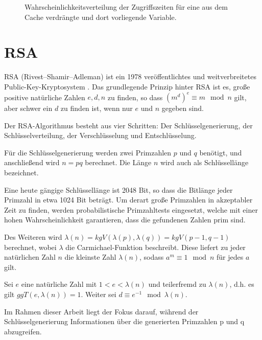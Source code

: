 \label{fig:RAMCacheLatency}
\begin{figure}[h]
\centering
\begin{scaletikzpicturetowidth}{\textwidth}

\end{scaletikzpicturetowidth}
\caption{Wahrscheinlichkeitsverteilung der Zugriffszeiten für eine aus dem Cache verdrängte und dort vorliegende Variable.}
\end{figure}

\section{RSA}

RSA (Rivest–Shamir–Adleman) ist ein 1978 veröffentlichtes und weitverbreitetes Public-Key-Kryptosystem \cite{RSAPaper}.
Das grundlegende Prinzip hinter RSA ist es,  große positive natürliche Zahlen $e,d,n$ zu finden, so dass $(m^d)^e \equiv m \mod n$ gilt, aber schwer ein $d$ zu finden ist, wenn nur $e$ und $n$ gegeben sind.

Der RSA-Algorithmus besteht aus vier Schritten: Der Schlüsselgenerierung, der Schlüsselverteilung, der Verschlüsselung und Entschlüsselung.

Für die Schlüsselgenerierung werden zwei Primzahlen $p$ und $q$ benötigt, und anschließend wird $n = pq$ berechnet. Die Länge $n$ wird auch als Schlüssellänge bezeichnet.

Eine heute gängige Schlüssellänge ist 2048 Bit, so dass die Bitlänge jeder Primzahl in etwa 1024 Bit beträgt. 
Um derart große Primzahlen in akzeptabler Zeit zu finden, werden probabilistische Primzahltests eingesetzt, welche mit einer hohen Wahrscheinlichkeit garantieren, dass die gefundenen Zahlen prim sind.

Des Weiteren wird $\lambda(n) = kgV(\lambda(p),\lambda(q)) = kgV(p-1, q-1)$ berechnet, wobei $\lambda$ die Carmichael-Funktion beschreibt.
Diese liefert zu jeder natürlichen Zahl $n$ die kleinste Zahl $\lambda(n)$, sodass $a^m \equiv 1 \mod n$ für jedes $a$ gilt.

Sei $e$ eine natürliche Zahl mit $1<e<\lambda(n)$ und teilerfremd zu $\lambda(n)$, d.h. es gilt $ggT(e,\lambda(n)) = 1$. Weiter sei $d \equiv e^{-1} \mod \lambda(n)$.

Im Rahmen dieser Arbeit liegt der Fokus darauf, während der Schlüsselgenerierung Informationen über die generierten Primzahlen p und q abzugreifen.


